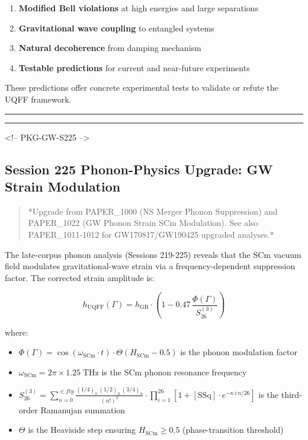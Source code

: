 \documentclass[12pt,a4paper]{article}
\begin{document}
\begin{enumerate}
  \item \textbf{Modified Bell violations} at high energies and large separations
  \item \textbf{Gravitational wave coupling} to entangled systems
  \item \textbf{Natural decoherence} from damping mechanism
  \item \textbf{Testable predictions} for current and near-future experiments
\end{enumerate}

These predictions offer concrete experimental tests to validate or refute the UQFF framework.

\medskip\hrule\medskip

\medskip\hrule\medskip

<!-- PKG-GW-S225 -->

\subsection{Session 225 Phonon-Physics Upgrade: GW Strain Modulation}

\begin{quote}
*Upgrade from PAPER\_1000 (NS Merger Phonon Suppression) and PAPER\_1022
(GW Phonon Strain SCm Modulation). See also PAPER\_1011-1012 for
GW170817/GW190425 upgraded analyses.*
\end{quote}

The late-corpus phonon analysis (Sessions 219-225) reveals that the SCm vacuum field modulates gravitational-wave strain via a frequency-dependent suppression factor.  The corrected strain amplitude is:

\begin{equation}
h_{\text{UQFF}}(\Gamma) = h_{\text{GR}} \cdot \left(1 - 0.47\,\frac{\Phi(\Gamma)}{S_{26}^{(3)}}\right)
\end{equation}

where:

\begin{itemize}
  \item $\Phi(\Gamma) = \cos(\omega_{\text{SCm}} \cdot t) \cdot \Theta(H_{\text{SCm}} - 0.5)$ is the phonon modulation factor
  \item $\omega_{\text{SCm}} = 2\pi \times 1.25\;\text{THz}$ is the SCm phonon resonance frequency
  \item $S_{26}^{(3)} = \sum_{n=0}^{\in fty} \frac{(1/4)_n\,(1/2)_n\,(3/4)_n}{(n!)^3} \cdot \prod_{i=1}^{26}\left[1 + [\text{SSq}]\cdot e^{-\kappa\,i\,n/26}\right]$ is the third-order Ramanujan summation
  \item $\Theta$ is the Heaviside step ensuring $H_{\text{SCm}} \geq 0.5$ (phase-transition threshold)
\end{itemize}
\end{document}

